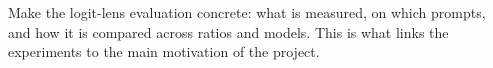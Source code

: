 Make the logit-lens evaluation concrete: what is measured, on which prompts, and how it is
compared across ratios and models. This is what links the experiments to the main
motivation of the project.